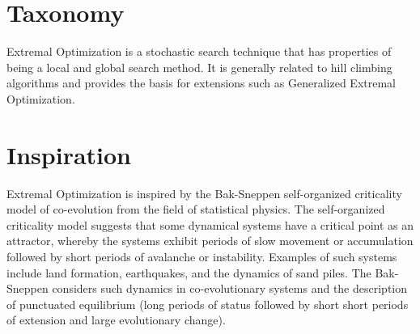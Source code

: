 \documentclass[a4paper, 11pt]{article}
\begin{document}
\section{Taxonomy}
\label{sec:taxonomy}
Extremal Optimization is a stochastic search technique that has properties of being a local and global search method.
It is generally related to hill climbing algorithms and provides the basis for extensions such as Generalized Extremal Optimization.

\section{Inspiration}
\label{sec:inspiration}
Extremal Optimization is inspired by the Bak-Sneppen self-organized criticality model of co-evolution from the field of statistical physics. 
The self-organized criticality model suggests that some dynamical systems have a critical point as an attractor, whereby the systems exhibit periods of slow movement or accumulation followed by short periods of avalanche or instability. Examples of such systems include land formation, earthquakes, and the dynamics of sand piles. The Bak-Sneppen considers such dynamics in co-evolutionary systems and the description of punctuated equilibrium (long periods of status followed by short short periods of extension and large evolutionary change).
\end{document}
